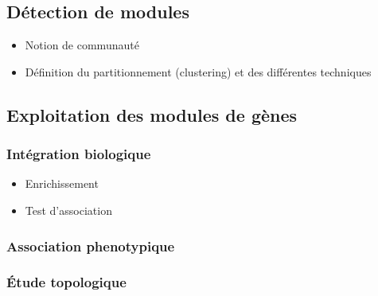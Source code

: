\subsection{Détection de modules}
\begin{itemize}
    \item Notion de communauté
    \item Définition du partitionnement (clustering) et des différentes techniques
\end{itemize}

\subsection{Exploitation des modules de gènes}

\subsubsection{Intégration biologique}
\begin{itemize}
    \item Enrichissement
    \item Test d'association
\end{itemize}

\subsubsection{Association phenotypique}


\subsubsection{Étude topologique}


